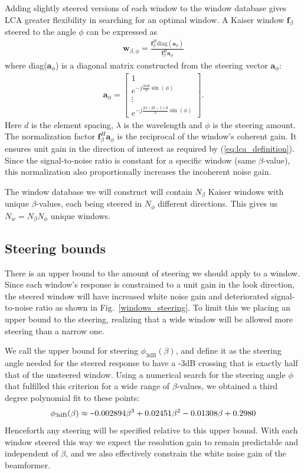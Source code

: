 \documentclass[10pt,journal,draftclsnofoot,onecolumn]{IEEEtran}
\newcommand\Fig[1]{Fig.~\ref{#1}}
\newcommand\bmat[1]{\begin{bmatrix}#1\end{bmatrix}}
\newcommand\diag{\text{diag}}
\renewcommand\H{^{\scriptscriptstyle H}}
\renewcommand\vec[1]{\boldsymbol{#1}}
\newcommand\1{\vec 1}
\renewcommand*\a{\vec a}
\newcommand*\f{\vec f}
\newcommand*\w{\vec w}
\newcommand\minus{\scalebox{0.75}[1.0]{$-$}}
\begin{document}
Adding slightly steered versions of each window to the window database gives LCA greater flexibility in searching for an optimal window. A Kaiser window $\f_\beta$ steered to the angle $\phi$ can be expressed as 
%
\begin{align}
\w_{\beta,\phi} = \frac{\f_\beta\H\diag{(\a_\phi)}}{\f_\beta\H\a_\phi}\label{eq:steered_window}
\end{align}
%
where diag($\a_\phi$) is a diagonal matrix constructed from the steering vector $\a_\phi$:
%
\begin{align}
\a_\phi = \bmat{
1 \\
e^{-j\frac{2\pi d}{\lambda}\sin(\phi)} \\
\vdots\\
e^{-j\frac{2\pi (M-1)d}{\lambda}\sin(\phi)}
}.\label{eq:steering_vector}
\end{align}
%
Here $d$ is the element spacing, $\lambda$ is the wavelength and $\phi$ is the steering amount. The normalization factor $\f_\beta\H\a_\phi$ is the reciprocal of the window's coherent gain. It ensures unit gain in the direction of interest as required by (\ref{eq:lca_definition}). Since the signal-to-noise ratio is constant for a specific window (same $\beta$-value), this normalization also proportionally increases the incoherent noise gain.

The window database we will construct will contain $N_\beta$ Kaiser windows with unique $\beta$-values, each being steered in $N_\phi$ different directions. This gives us $N_w = N_\beta N_\phi$ unique windows.


\subsection{Steering bounds}\label{sec:lca_steering_bounds}

There is an upper bound to the amount of steering we should apply to a window. Since each window's response is constrained to a unit gain in the look direction, the steered window will have increased white noise gain and deteriorated signal-to-noise ratio as shown in \Fig{windows_steering}. To limit this we placing an upper bound to the steering, realizing that  a wide window will be allowed more steering than a narrow one.

We call the upper bound for steering $\phi_{\text{3dB}}(\beta)$, and define it as the steering angle needed for the steered response to have a -3dB crossing that is exactly half that of the unsteered window. Using a numerical search for the steering angle $\phi$ that fulfilled this criterion for a wide range of $\beta$-values, we obtained a third degree polynomial fit to these points:
%
\begin{align}
\phi_\text{3dB}(\beta) \approx \minus{}0.002894\beta^3 + 0.02451\beta^2 - 0.01308\beta + 0.2980\label{eq:steering_kaiser_3dB}
\end{align}
%
Henceforth any steering will be specified relative to this upper bound. With each window steered this way we expect the resolution gain to remain predictable and independent of $\beta$, and we also effectively constrain the white noise gain of the beamformer.
\end{document}
